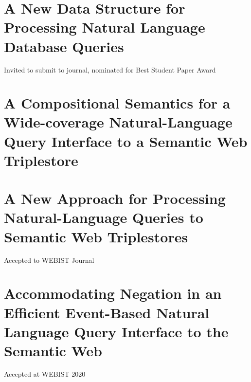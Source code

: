 \documentclass[../main.tex]{subfiles}
\begin{document}
\begin{refsection}
\section{A New Data Structure for Processing Natural Language Database Queries}


Invited to submit to journal, nominated for Best Student Paper Award

\section{A Compositional Semantics for a Wide-coverage Natural-Language Query Interface to a Semantic Web Triplestore}


\section{A New Approach for Processing Natural-Language Queries to Semantic Web Triplestores}


Accepted to WEBIST Journal

\section{Accommodating Negation in an Efficient Event-Based Natural Language Query Interface to the Semantic Web}


Accepted at WEBIST 2020


\printbibliography[heading=subbibintoc]
\end{refsection}
\end{document}
